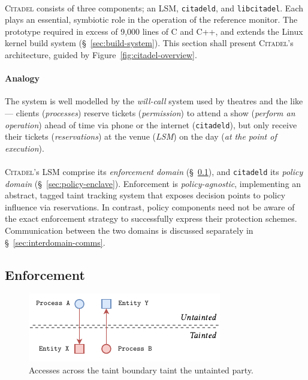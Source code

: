 \paragraph{} \textsc{Citadel} consists of three components; an LSM, \texttt{citadeld}, and \texttt{libcitadel}. Each plays an essential, symbiotic role in the operation of the reference monitor. The prototype required in excess of 9,000 lines of C and C++, and extends the Linux kernel build system (§~\ref{sec:build-system}). This section shall present \textsc{Citadel}'s architecture, guided by Figure~\ref{fig:citadel-overview}.

\paragraph{Analogy} The system is well modelled by the \textit{will-call} system used by theatres and the like --- clients (\textit{processes}) reserve tickets (\textit{permission}) to attend a show (\textit{perform an operation}) ahead of time via phone or the internet (\texttt{citadeld}), but only receive their tickets (\textit{reservations}) at the venue (\textit{LSM}) on the day (\textit{at the point of execution}).

\paragraph{} \textsc{Citadel}'s LSM comprise its \textit{enforcement domain} (§~\ref{sec:enforcement-domain}), and \texttt{citadeld} its \textit{policy domain} (§~\ref{sec:policy-enclave}). Enforcement is \textit{policy-agnostic}, implementing an abstract, tagged taint tracking system that exposes decision points to policy influence via reservations. In contrast, policy components need not be aware of the exact enforcement strategy to successfully express their protection schemes. Communication between the two domains is discussed separately in §~\ref{sec:interdomain-comms}.



\subsection{Enforcement}
\label{sec:enforcement-domain}

\begin{figure}[]
    \centering
    \includegraphics[width=0.55\linewidth]{figures/CitadelTaint.pdf}
    \caption[Accesses across the taint boundary]{Accesses across the taint boundary taint the untainted party.}
    \label{fig:taint-boundary}
\end{figure}

